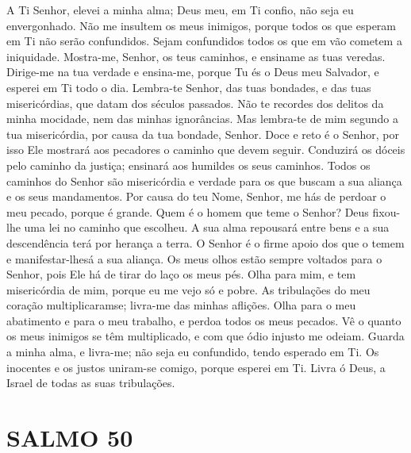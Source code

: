 \documentclass{subfiles}
\begin{document}
A Ti Senhor, elevei a minha alma; Deus meu, em Ti confio, não seja eu
envergonhado. Não me insultem os meus inimigos, porque todos os que esperam em
Ti não serão confundidos. Sejam confundidos todos os que em vão cometem a
iniquidade. Mostra-me, Senhor, os teus caminhos, e ensiname as tuas veredas.
Dirige-me na tua verdade e ensina-me, porque Tu és o Deus meu Salvador, e
esperei em Ti todo o dia. Lembra-te Senhor, das tuas bondades, e das tuas
misericórdias, que datam dos séculos passados. Não te recordes dos delitos da
minha mocidade, nem das minhas ignorâncias. Mas lembra-te de mim segundo a tua
misericórdia, por causa da tua bondade, Senhor. Doce e reto é o Senhor, por isso
Ele mostrará aos pecadores o caminho que devem seguir. Conduzirá os dóceis pelo
caminho da justiça; ensinará aos humildes os seus caminhos. Todos os caminhos do
Senhor são misericórdia e verdade para os que buscam a sua aliança e os seus
mandamentos. Por causa do teu Nome, Senhor, me hás de perdoar o meu pecado,
porque é grande. Quem é o homem que teme o Senhor? Deus fixou-lhe uma lei no
caminho que escolheu. A sua alma repousará entre bens e a sua descendência terá
por herança a terra. O Senhor é o firme apoio dos que o temem e manifestar-lhesá
a sua aliança. Os meus olhos estão sempre voltados para o Senhor, pois Ele há de
tirar do laço os meus pés. Olha para mim, e tem misericórdia de mim, porque eu
me vejo só e pobre. As tribulações do meu coração multiplicaramse; livra-me das
minhas aflições. Olha para o meu abatimento e para o meu trabalho, e perdoa
todos os meus pecados. Vê o quanto os meus inimigos se têm multiplicado, e com
que ódio injusto me odeiam. Guarda a minha alma, e livra-me; não seja eu
confundido, tendo esperado em Ti. Os inocentes e os justos uniram-se comigo,
porque esperei em Ti. Livra ó Deus, a Israel de todas as suas tribulações.

\section*{SALMO 50}
\end{document}
